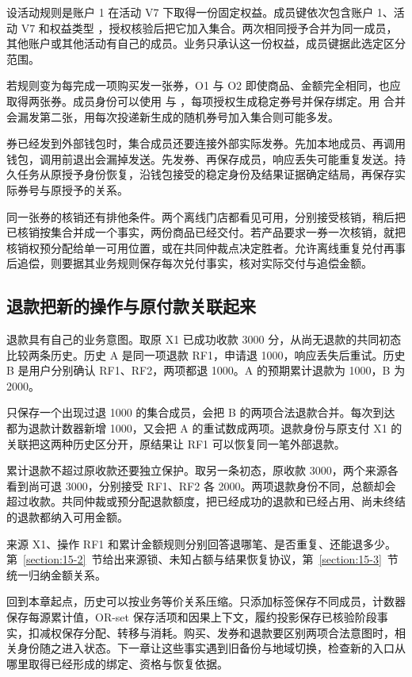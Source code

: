 设活动规则是账户 1 在活动 V7 下取得一份固定权益。成员键依次包含账户 1、活动 V7 和权益类型 ，授权核验后把它加入集合。两次相同授予合并为同一成员，其他账户或其他活动有自己的成员。业务只承认这一份权益，成员键据此选定区分范围。

若规则变为每完成一项购买发一张券，O1 与 O2 即使商品、金额完全相同，也应取得两张券。成员身份可以使用  与 ，每项授权生成稳定券号并保存绑定。用  合并会漏发第二张，用每次投递新生成的随机券号加入集合则可能多发。


券已经发到外部钱包时，集合成员还要连接外部实际发券。先加本地成员、再调用钱包，调用前退出会漏掉发送。先发券、再保存成员，响应丢失可能重复发送。持久任务从原授予身份恢复，沿钱包接受的稳定身份及结果证据确定结局，再保存实际券号与原授予的关系。

同一张券的核销还有排他条件。两个离线门店都看见可用，分别接受核销，稍后把已核销按集合并成一个事实，两份商品已经交付。若产品要求一券一次核销，就把核销权预分配给单一可用位置，或在共同仲裁点决定胜者。允许离线重复兑付再事后追偿，则要据其业务规则保存每次兑付事实，核对实际交付与追偿金额。

\subsection*{退款把新的操作与原付款关联起来}

退款具有自己的业务意图。取原 X1 已成功收款 3000 分，从尚无退款的共同初态比较两条历史。历史 A 是同一项退款 RF1，申请退 1000，响应丢失后重试。历史 B 是用户分别确认 RF1、RF2，两项都退 1000。A 的预期累计退款为 1000，B 为 2000。

只保存一个出现过退 1000 的集合成员，会把 B 的两项合法退款合并。每次到达都为退款计数器新增 1000，又会把 A 的重试数成两项。退款身份与原支付 X1 的关联把这两种历史区分开，原结果让 RF1 可以恢复同一笔外部退款。


累计退款不超过原收款还要独立保护。取另一条初态，原收款 3000，两个来源各看到尚可退 3000，分别接受 RF1、RF2 各 2000。两项退款身份不同，总额却会超过收款。共同仲裁或预分配退款额度，把已经成功的退款和已经占用、尚未终结的退款都纳入可用金额。

来源 X1、操作 RF1 和累计金额规则分别回答退哪笔、是否重复、还能退多少。第~\ref{section:15-2}~节给出来源锁、未知占额与结果恢复协议，第~\ref{section:15-3}~节统一归纳金额关系。

回到本章起点，历史可以按业务等价关系压缩。只添加标签保存不同成员，计数器保存每源累计值，OR-set 保存活项和因果上下文，履约投影保存已核验阶段事实，扣减权保存分配、转移与消耗。购买、发券和退款要区别两项合法意图时，相关身份随之进入状态。下一章让这些事实遇到旧备份与地域切换，检查新的入口从哪里取得已经形成的绑定、资格与恢复依据。
\FloatBarrier
